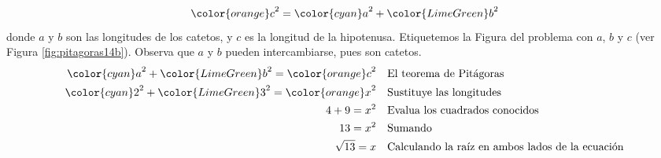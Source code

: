 \begin{solutionbox}{11cm}
\begin{minipage}{0.65\textwidth}
        \[{\color{orange}c}^2={\color{cyan}a}^2+{\color{LimeGreen}b}^2\]
        donde $a$ y $b$ son las longitudes de los catetos, y $c$ es la longitud de la hipotenusa.
        Etiquetemos la Figura del problema con $a$, $b$ y $c$ (ver Figura \ref{fig:pitagoras14b}).
        Observa que $a$ y $b$ pueden intercambiarse, pues son catetos.
        \begin{align*}
            {\color{cyan}a}^2+{\color{LimeGreen}b}^2  ={\color{orange}c}^2 & \text{\quad El teorema de Pitágoras}                          \\
            {\color{cyan}2}^2+{\color{LimeGreen}3}^2  ={\color{orange}x}^2 & \text{\quad Sustituye las longitudes}                         \\
            4+9  =x^2                                                      & \text{\quad Evalua los cuadrados conocidos}                   \\
            13=x^2                                                         & \text{\quad Sumando }                                         \\
            \sqrt{13}=x                                                    & \text{\quad Calculando la raíz en ambos lados de la ecuación} \\
        \end{align*}
    \end{minipage}
\end{solutionbox}
